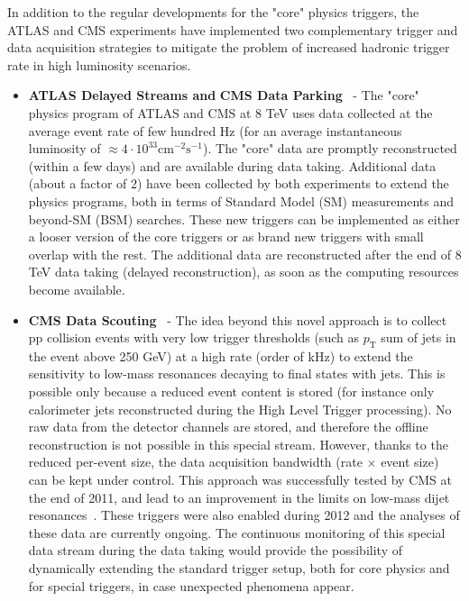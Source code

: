 \documentclass{PoS}
\begin{document}
In addition to the regular developments for the "core" physics triggers, the 
ATLAS and CMS experiments have implemented two complementary trigger and data 
acquisition strategies to mitigate the problem of increased 
hadronic trigger rate in high luminosity scenarios.
\begin{itemize}
\item {\bf ATLAS Delayed Streams and} {\bf CMS Data Parking}~\cite{CMS-DP-2012-022} - 
The "core" physics program of ATLAS and CMS  at 8 TeV uses data collected
at the average event rate of few hundred Hz (for an average instantaneous luminosity of 
$\approx 4 \cdot 10^{33} \mbox{cm}^{-2}\mbox{s}^{-1}$). 
The "core" data are promptly reconstructed (within a few days) and are available during data taking. 
Additional data (about a factor of 2) have been collected by both experiments 
to extend the physics programs, both in terms of Standard Model (SM) 
measurements and beyond-SM (BSM) searches. 
These new triggers can be implemented as either a looser version of the core triggers
or as brand new triggers with small overlap with the rest. 
The additional data are reconstructed after the end of 8 TeV data 
taking (delayed reconstruction), as soon as the computing resources become available.
\item {\bf CMS Data Scouting}~\cite{CMS-DP-2012-022} - The idea beyond this novel approach 
is to collect pp collision events with very low trigger thresholds (such as $p_\mathrm{T}$ sum 
of jets in the event above 250 GeV) at a high rate (order of kHz) 
to extend the sensitivity to low-mass resonances decaying to final 
states with jets. This is possible only because a reduced event content 
is stored (for instance only calorimeter jets reconstructed during the High Level Trigger processing). 
No raw data from the detector channels are stored, and therefore the offline reconstruction 
is not possible in this special stream. However, thanks to the reduced per-event size, 
the data acquisition bandwidth (rate $\times$ event size) can be kept
under control. This approach was successfully tested by CMS at the end of 2011, 
and lead to an improvement in the limits on low-mass dijet resonances~\cite{CMS-PAS-EXO-11-094}. 
These triggers were also enabled during 2012 and the analyses of these data 
are currently ongoing. The continuous monitoring of this special data stream during the 
data taking would provide the possibility of dynamically extending the standard trigger 
setup, both for core physics and for special triggers, in case unexpected phenomena appear. 
\end{itemize}
\end{document}
